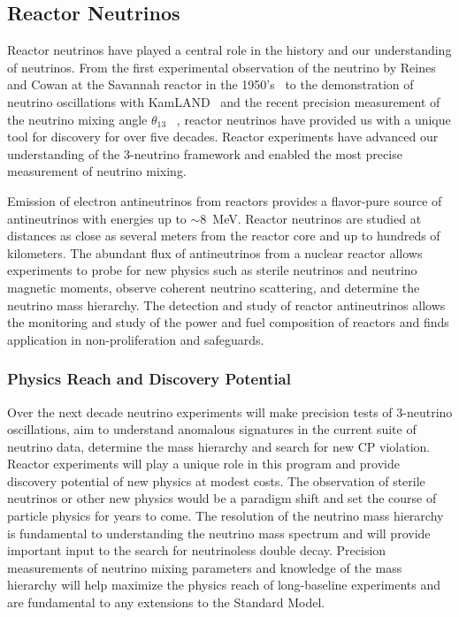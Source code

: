 \pagebreak
\subsection{Reactor Neutrinos}
\label{sec:Reactor}

Reactor neutrinos have played a central role in the history and our
understanding of neutrinos.  From the first experimental observation
of the neutrino by Reines and Cowan at the Savannah reactor in the
1950's~\cite{Reines:1960pr} to the demonstration of neutrino
oscillations with KamLAND~\cite{Abe:2008aa} and the recent precision
measurement of the neutrino mixing angle $\theta_{13}$
~\cite{Abe:2012tg, An:2013zwz}, reactor neutrinos have provided us
with a unique tool for discovery for over five decades. Reactor
experiments have advanced our understanding of the 3-neutrino
framework and enabled the most precise measurement of neutrino mixing.

Emission of electron antineutrinos from reactors provides a
flavor-pure source of antineutrinos with energies up to
$\sim$8~MeV. Reactor neutrinos are studied at distances as close as
several meters from the reactor core and up to hundreds of kilometers.
The abundant flux of antineutrinos from a nuclear reactor allows
experiments to probe for new physics such as sterile neutrinos and
neutrino magnetic moments, observe coherent neutrino scattering, and
determine the neutrino mass hierarchy. The detection and study of
reactor antineutrinos allows the monitoring and study of the power and
fuel composition of reactors and finds application in
non-proliferation and safeguards.

\subsubsection{Physics Reach and Discovery Potential}
Over the next decade neutrino experiments will make precision tests of
3-neutrino oscillations, aim to understand anomalous signatures in the
current suite of neutrino data, determine the mass hierarchy and
search for new CP violation. Reactor experiments will play a unique
role in this program and provide discovery potential of new physics at
modest costs. The observation of sterile neutrinos or other new
physics would be a paradigm shift and set the course of particle
physics for years to come.  The resolution of the neutrino mass
hierarchy is fundamental to understanding the neutrino mass spectrum
and will provide important input to the search for neutrinoless double
decay. Precision measurements of neutrino mixing parameters and
knowledge of the mass hierarchy will help maximize the physics reach
of long-baseline experiments and are fundamental to any extensions to
the Standard Model.

